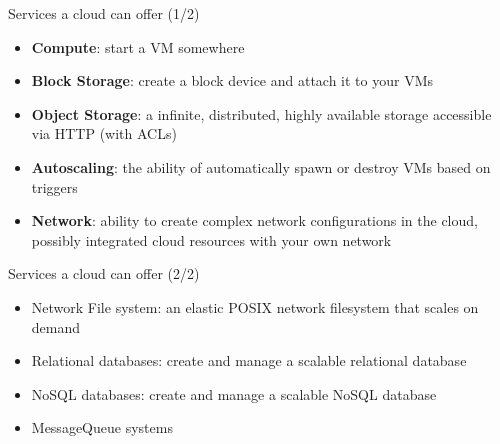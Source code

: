 \documentclass[english,serif,mathserif,usenames,dvipsnames]{beamer}
\begin{document}
\begin{frame}
  {Services a cloud can offer (1/2)}

  \begin{itemize}
  \item \textbf{Compute}: start a VM somewhere\+
  \item \textbf{Block Storage}: create a block device and attach it to
    your VMs\+
  \item \textbf{Object Storage}: a infinite, distributed, highly
    available storage accessible via HTTP (with ACLs)\+
  \item \textbf{Autoscaling}: the ability of automatically spawn or
    destroy VMs based on triggers\+
  \item \textbf{Network}: ability to create complex network
    configurations in the cloud, possibly integrated cloud resources
    with your own network
  \end{itemize}
\end{frame}

\begin{frame}
  {Services a cloud can offer (2/2)}

  \begin{itemize}
  \item Network File system: an elastic POSIX network filesystem that
    scales on demand\+
  \item Relational databases: create and manage a scalable relational
    database\+
  \item NoSQL databases: create and manage a scalable NoSQL database\+
  \item MessageQueue systems\+
  \end{itemize}
\end{frame}
\end{document}
